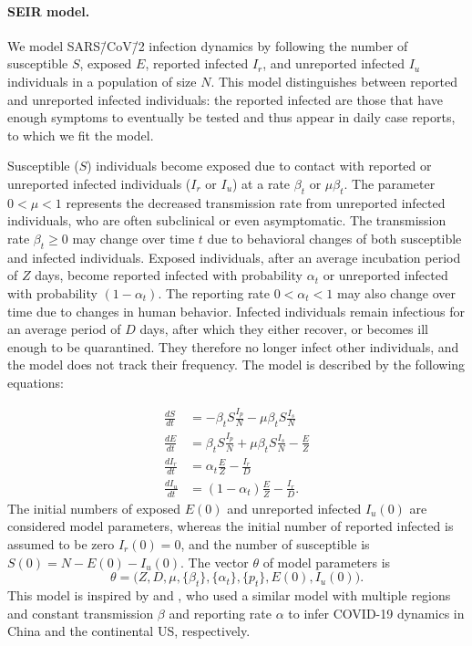 \documentclass[12pt]{extarticle}
\begin{document}
\paragraph*{SEIR model.}
We model SARS\=/CoV\=/2 infection dynamics by following the number of susceptible $S$, exposed $E$, reported infected $I_r$, and unreported infected $I_u$ individuals in a population of size $N$.
This model distinguishes between reported and unreported infected individuals: the reported infected are those that have enough symptoms to eventually be tested and thus appear in daily case reports, to which we fit the model.

Susceptible ($S$) individuals become exposed due to contact with reported or unreported infected individuals ($I_r$ or $I_u$) at a rate $\beta_t$ or $\mu \beta_t$.
The parameter $0 < \mu < 1$ represents the decreased transmission rate from unreported infected individuals, who are often subclinical or even asymptomatic.
The transmission rate $\beta_t \ge 0$ may change over  time $t$ due to behavioral changes of both susceptible and infected individuals.
Exposed individuals, after an average incubation period of $Z$ days, become reported infected with probability $\alpha_t$ or unreported infected with probability $(1-\alpha_t)$.
The reporting rate $0 < \alpha_t < 1$ may also change over time due to changes in human behavior.
Infected individuals remain infectious for an average period of $D$ days, after which they either recover, or becomes ill enough to be quarantined.
They therefore no longer infect other individuals, and the model does not track their frequency.
The model is described by the following equations:

\begin{equation} \label{eq:model}
\begin{aligned}
\frac{dS}{dt} & = -\beta_t S \frac{I_p}{N} - \mu \beta_t S \frac{I_s}{N} \\
\frac{dE}{dt} & = \beta_t S \frac{I_p}{N} + \mu \beta_t S \frac{I_s}{N}  - \frac{E}{Z} \\
\frac{dI_r}{dt} & = \alpha_t \frac{E}{Z} - \frac{I_r}{D} \\
\frac{dI_u}{dt} & = (1-\alpha_t) \frac{E}{Z} - \frac{I_r}{D} .
\end{aligned}
\end{equation}
The initial numbers of exposed $E(0)$ and unreported infected $I_u(0)$ are considered model parameters, whereas the initial number of reported infected is assumed to be zero $I_r(0)=0$, and the number of susceptible is $S(0)=N-E(0)-I_u(0)$.
The vector $\theta$ of model parameters is
\begin{equation} \label{eq:theta}
\theta=\Big(Z, D, \mu, \{\beta_t\}, \{\alpha_t\}, \{p_t\}, E(0), I_u(0)\Big).
\end{equation}
This model is inspired by \citet{Li2020} and \citet{Pei2020}, who used a similar model with multiple regions and constant transmission $\beta$ and reporting rate $\alpha$ to infer COVID-19 dynamics in China and the continental US, respectively.
\end{document}
